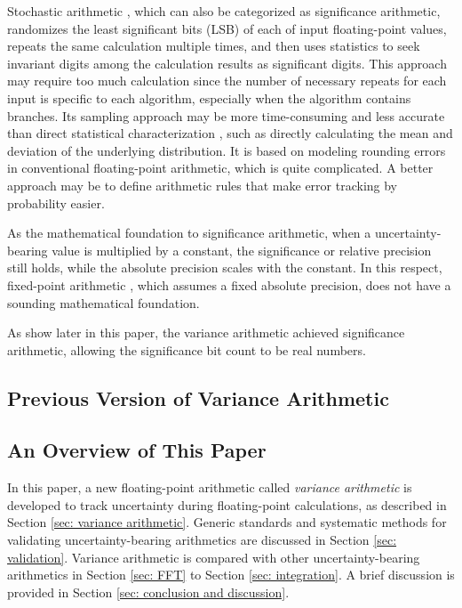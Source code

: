\documentclass[twoside]{article}
\numberwithin{equation}{section}
\begin{document}
Stochastic arithmetic \cite{Stochastic_Arithmetic}\cite{CADNA_library}, which can also be categorized as significance arithmetic, randomizes the least significant bits (LSB) of each of input floating-point values, repeats the same calculation multiple times, and then uses statistics to seek invariant digits among the calculation results as significant digits.  
This approach may require too much calculation since the number of necessary repeats for each input is specific to each algorithm, especially when the algorithm contains branches.  
Its sampling approach may be more time-consuming and less accurate than direct statistical characterization \cite{Probability_Statistics}, such as directly calculating the mean and deviation of the underlying distribution.  
It is based on modeling rounding errors in conventional floating-point arithmetic, which is quite complicated.  
A better approach may be to define arithmetic rules that make error tracking by probability easier.

As the mathematical foundation to significance arithmetic, when a uncertainty-bearing value is multiplied by a constant, the significance or relative precision still holds, while the absolute precision \cite{Statistical_Methods}\cite{Precisions_Physical_Measurements} scales with the constant.  
In this respect, fixed-point arithmetic \cite{Fixed_Point_Arithmetic}, which assumes a fixed absolute precision, does not have a sounding mathematical foundation.

As show later in this paper, the variance arithmetic achieved significance arithmetic, allowing the significance bit count to be real numbers.



\subsection{Previous Version of Variance Arithmetic}

\subsection{ An Overview of This Paper}

In this paper, a new floating-point arithmetic called \emph{variance arithmetic} \cite{Prev_Precision_Arithmetic} is developed to track uncertainty during floating-point calculations, as described in Section \ref{sec: variance arithmetic}.  Generic standards and systematic methods for validating uncertainty-bearing arithmetics are discussed in Section \ref{sec: validation}.  Variance arithmetic is compared with other uncertainty-bearing arithmetics in Section \ref{sec: FFT} to Section \ref{sec: integration}.  A brief discussion is provided in Section \ref{sec: conclusion and discussion}.
\end{document}

